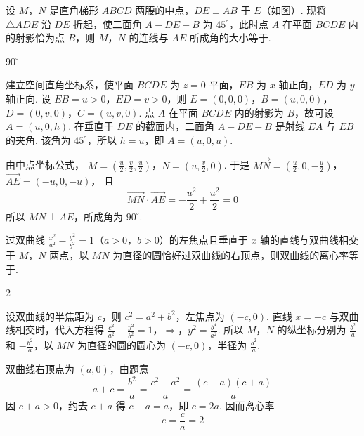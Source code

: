 \begin{problem}
设 \(M\)，\(N\) 是直角梯形 \(ABCD\) 两腰的中点，\(DE \perp AB\) 于 \(E\)（如图）. 现将 \(\triangle ADE\) 沿 \(DE\) 折起，使二面角 \(A-DE-B\) 为 \(45^{\circ}\)，此时点 \(A\) 在平面 \(BCDE\) 内的射影恰为点 \(B\)，则 \(M\)，\(N\) 的连线与 \(AE\) 所成角的大小等于\fillinblank{}.


\begin{answer}
\(90^{\circ}\)
\end{answer}

\begin{solution}
建立空间直角坐标系，使平面 \(BCDE\) 为 \(z=0\) 平面，\(EB\) 为 \(x\) 轴正向，\(ED\) 为 \(y\) 轴正向. 设 \(EB=u>0\)，\(ED=v>0\)，则
\(E=(0,0,0)\)，\(B=(u,0,0)\)，\(D=(0,v,0)\)，\(C=(u,v,0)\).
点 \(A\) 在平面 \(BCDE\) 内的射影为 \(B\)，故可设 \(A=(u,0,h)\). 在垂直于 \(DE\) 的截面内，二面角 \(A-DE-B\) 是射线 \(EA\) 与 \(EB\) 的夹角. 该角为 \(45^{\circ}\)，所以 \(h=u\)，即 \(A=(u,0,u)\).

由中点坐标公式，
\(M=\left(\frac{u}{2},\frac{v}{2},\frac{u}{2}\right)\)，\(N=\left(u,\frac{v}{2},0\right)\).
于是
\(\overrightarrow{MN}=\left(\frac{u}{2},0,-\frac{u}{2}\right)\)，\(\overrightarrow{AE}=(-u,0,-u)\)，
且
\[
\overrightarrow{MN}\cdot\overrightarrow{AE}
=-\frac{u^2}{2}+\frac{u^2}{2}=0
\]
所以 \(MN\perp AE\)，所成角为 \(90^{\circ}\).
\end{solution}
\end{problem}

\begin{problem}
过双曲线 \( \frac{x^{2}}{a^{2}} - \frac{y^{2}}{b^{2}} = 1 \)（\(a > 0\)，\(b > 0\)）的左焦点且垂直于 \(x\) 轴的直线与双曲线相交于 \(M\)，\(N\) 两点，以 \(MN\) 为直径的圆恰好过双曲线的右顶点，则双曲线的离心率等于\fillinblank{}.

\begin{answer}
\(2\)
\end{answer}

\begin{solution}
设双曲线的半焦距为 \(c\)，则 \(c^2=a^2+b^2\)，左焦点为 \((-c,0)\). 直线 \(x=-c\) 与双曲线相交时，代入方程得
\(\frac{c^2}{a^2}-\frac{y^2}{b^2}=1\)，\(\Longrightarrow\)，\(y^2=\frac{b^4}{a^2}\).
所以 \(M\)，\(N\) 的纵坐标分别为 \(\frac{b^2}{a}\) 和 \(-\frac{b^2}{a}\)，以 \(MN\) 为直径的圆的圆心为 \((-c,0)\)，半径为 \(\frac{b^2}{a}\).

双曲线右顶点为 \((a,0)\)，由题意
\[
a+c=\frac{b^2}{a}=\frac{c^2-a^2}{a}=\frac{(c-a)(c+a)}{a}
\]
因 \(c+a>0\)，约去 \(c+a\) 得 \(c-a=a\)，即 \(c=2a\). 因而离心率
\[
e=\frac{c}{a}=2
\]
\end{solution}
\end{problem}

